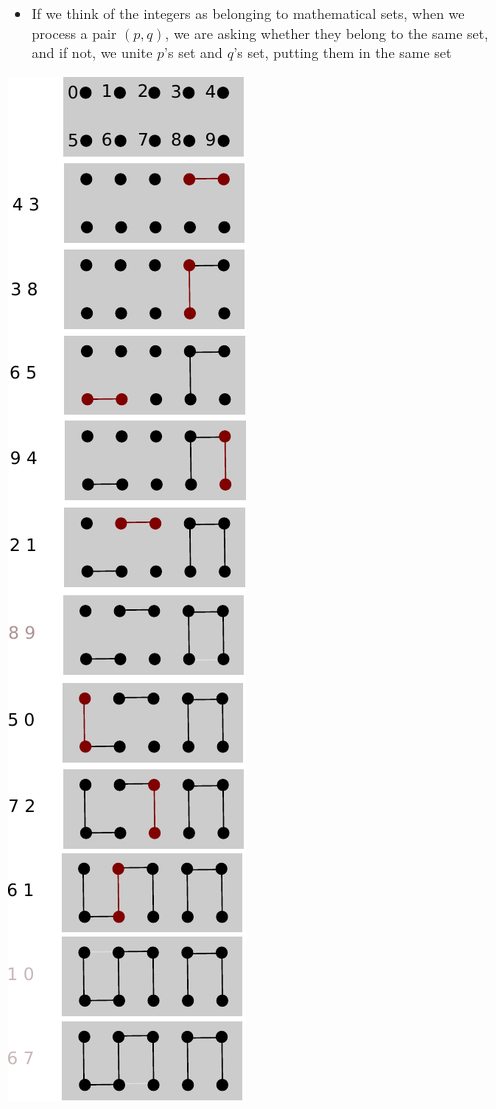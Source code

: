\documentclass[8pt,a4paper,compress]{beamer}
\begin{document}
\begin{frame}[fragile]
\begin{minipage}{250pt}
\begin{itemize}
\item If we think of the integers as belonging to mathematical sets, when we process a pair $(p, q)$, we are asking whether they belong to the same set, and if not, we unite $p$'s set and $q$'s set, putting them in the same set
\end{itemize}
\end{minipage}%
\begin{minipage}{60pt}
\hfill \includegraphics[scale=0.35]{./figures/dyn_conn.pdf}
\end{minipage}
\end{frame}
\end{document}

